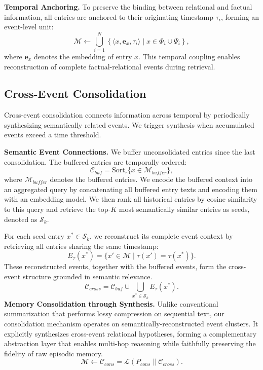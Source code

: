 \textbf{Temporal Anchoring.}
To preserve the binding between relational and factual information, all entries are anchored to their originating timestamp $\tau_i$, forming an event-level unit:
\begin{equation}
\mathcal{M} \leftarrow  \bigcup_{i=1}^{N} \left\{ \langle x, \mathbf{e}_x, \tau_i \rangle \mid x \in \Phi_i \cup \Psi_i \right\},
\end{equation}
where $\mathbf{e}_x$ denotes the embedding of entry $x$. This temporal coupling enables reconstruction of complete factual-relational events during retrieval.


\subsection{Cross-Event Consolidation}
\label{sec:cross-event} 
Cross-event consolidation connects information across temporal by periodically synthesizing semantically related events. We trigger synthesis when accumulated events exceed a time threshold.

\textbf{Semantic Event Connections.} 
We buffer unconsolidated entries since the last consolidation. The buffered entries are temporally ordered:
\begin{equation}
\mathcal{C}_{buf} = \text{Sort}_{\tau} \{ x \in \mathcal{M}_{buffer} \},
\end{equation}
where $\mathcal{M}_{buffer}$ denotes the buffered entries. We encode the buffered context into an aggregated query by concatenating all buffered entry texts and encoding them with an embedding model. We then rank all historical entries by cosine similarity to this query and retrieve the top-$K$ most semantically similar entries as seeds, denoted as $\mathcal{S}_k$.

For each seed entry $x^* \in \mathcal{S}_k$, we reconstruct its complete event context by retrieving all entries sharing the same timestamp:
\begin{equation}
{E}_{\tau}(x^*) = \{ x' \in \mathcal{M} \mid \tau(x') = \tau(x^*) \}.
\end{equation}
These reconstructed events, together with the buffered events, form the cross-event structure grounded in semantic relevance.
\begin{equation}
\mathcal{C}_{cross} = \mathcal{C}_{buf} \cup \bigcup_{x^* \in \mathcal{S}_k} {E}_{\tau}(x^*).
\end{equation}
\textbf{Memory Consolidation through Synthesis.} 
Unlike conventional summarization that performs lossy compression on sequential text, our consolidation mechanism operates on semantically-reconstructed event clusters. It explicitly synthesizes cross-event relational hypotheses, forming a complementary abstraction layer that enables multi-hop reasoning while faithfully preserving the fidelity of raw episodic memory.
\begin{equation}
\mathcal{M} \leftarrow \mathcal{C}_{cons} = \mathcal{L}( P_{cons} \| \mathcal{C}_{cross} ).
\end{equation}